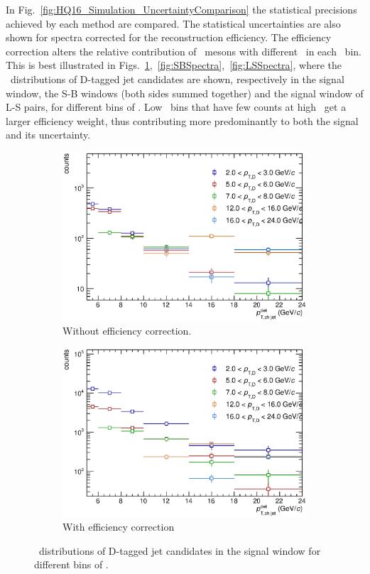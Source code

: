 In Fig.~\ref{fig:HQ16_Simulation_UncertaintyComparison} the statistical precisions achieved by each method are compared. 
The statistical uncertainties are also shown for spectra corrected for the reconstruction efficiency. The efficiency correction alters the 
relative contribution of \Dzero\ mesons with different \pt\ in each \ptchjet\ bin. This is best illustrated in Figs.~\ref{fig:SigSpectra},~\ref{fig:SBSpectra},~\ref{fig:LSSpectra}, where the \ptchjetdet\ distributions
of D-tagged jet candidates are shown, respectively in the signal window, the S-B windows (both sides summed together) and the signal window of L-S pairs,
for different bins of \ptd. Low \ptd\ bins that have few counts at high \ptchjetdet\ get a larger efficiency weight, thus contributing more predominantly to both the signal and
its uncertainty.
\begin{figure}[tbh]
\centering
\begin{subfigure}{0.49\textwidth}
  \centering
  \includegraphics[width=1.0\linewidth]{img/HQ16_Simulation_SigSpectra}
  \caption{Without efficiency correction.}
\end{subfigure}
\begin{subfigure}{0.49\textwidth}
  \centering
  \includegraphics[width=1.0\linewidth]{img/HQ16_Simulation_SigSpectra_Eff}
  \caption{With efficiency correction}
\end{subfigure}
\caption{\ptchjetdet\ distributions of D-tagged jet candidates in the signal window for different bins of \ptd.}
\label{fig:SigSpectra}
\end{figure}

